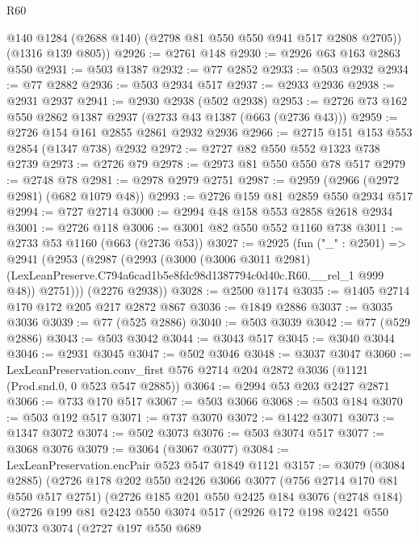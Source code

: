 \begin{lexlean}{R60}
\begin{coremodule}
        @140
        @1284
        (@2688 @140)
        (@2798 @81 @550 @550 @941 @517 @2808 @2705))
      (@1316 @139 @805))
@2926 := @2761 @148
@2930 := @2926 @63 @163 @2863 @550
@2931 := @503 @1387
@2932 := @77 @2852
@2933 := @503 @2932
@2934 := @77 @2882
@2936 := @503 @2934 @517
@2937 := @2933 @2936
@2938 := @2931 @2937
@2941 := @2930 @2938 (@502 @2938)
@2953 := @2726 @73 @162 @550 @2862 @1387 @2937 (@2733 @43 @1387 (@663 (@2736 @43)))
@2959 := @2726 @154 @161 @2855 @2861 @2932 @2936
@2966 := @2715 @151 @153 @553 @2854 (@1347 @738) @2932
@2972 := @2727 @82 @550 @552 @1323 @738 @2739
@2973 := @2726 @79
@2978 := @2973 @81 @550 @550 @78 @517
@2979 := @2748 @78
@2981 := @2978 @2979 @2751
@2987 := @2959 (@2966 (@2972 @2981) (@682 @1079 @48))
@2993 := @2726 @159 @81 @2859 @550 @2934 @517
@2994 := @727 @2714
@3000 := @2994 @48 @158 @553 @2858 @2618 @2934
@3001 := @2726 @118
@3006 := @3001 @82 @550 @552 @1160 @738
@3011 := @2733 @53 @1160 (@663 (@2736 @53))
@3027 := @2925
    (fun ("_" : @2501) =>
    @2941
      (@2953
        (@2987
          (@2993
            (@3000
              (@3006 @3011 @2981)
              (LexLeanPreserve.C794a6cad1b5e8fdc98d1387794c0d40c.R60.__rel_1 @999 @48))
            @2751)))
      (@2276 @2938))
@3028 := @2500 @1174
@3035 := @1405 @2714 @170 @172 @205 @217 @2872 @867
@3036 := @1849 @2886
@3037 := @3035 @3036
@3039 := @77 (@525 @2886)
@3040 := @503 @3039
@3042 := @77 (@529 @2886)
@3043 := @503 @3042
@3044 := @3043 @517
@3045 := @3040 @3044
@3046 := @2931 @3045
@3047 := @502 @3046
@3048 := @3037 @3047
@3060 := LexLeanPreservation.conv_first
    @576
    @2714
    @204
    @2872
    @3036
    (@1121 (Prod.snd.{0, 0} @523 @547 @2885))
@3064 := @2994 @53 @203 @2427 @2871
@3066 := @733 @170 @517
@3067 := @503 @3066
@3068 := @503 @184
@3070 := @503 @192 @517
@3071 := @737 @3070
@3072 := @1422 @3071
@3073 := @1347 @3072
@3074 := @502 @3073
@3076 := @503 @3074 @517
@3077 := @3068 @3076
@3079 := @3064 (@3067 @3077)
@3084 := LexLeanPreservation.encPair @523 @547 @1849 @1121
@3157 := @3079
    (@3084 @2885)
    (@2726
      @178
      @202
      @550
      @2426
      @3066
      @3077
      (@756 @2714 @170 @81 @550 @517 @2751)
      (@2726
        @185
        @201
        @550
        @2425
        @184
        @3076
        (@2748 @184)
        (@2726
          @199
          @81
          @2423
          @550
          @3074
          @517
          (@2926
            @172
            @198
            @2421
            @550
            @3073
            @3074
            (@2727
              @197
              @550
              @689

\end{coremodule}
\end{lexlean}
